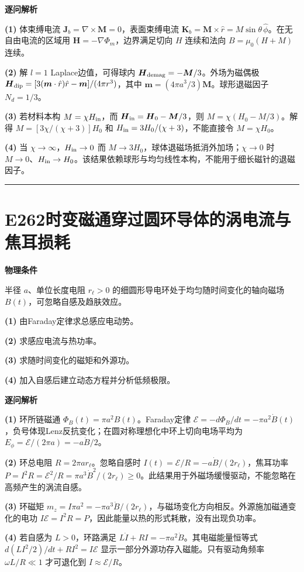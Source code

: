 \documentclass[UTF8,a4paper,11pt,oneside,openany]{ctexbook}
\begin{document}
\par\medskip\noindent\textbf{逐问解析}
\par\noindent\textbf{(1)} 体束缚电流 \(\boldsymbol J_b=\nabla\times\boldsymbol M=0\)，表面束缚电流 \(\boldsymbol K_b=\boldsymbol M\times\hat r=M\sin\theta\,\hat\phi\)。在无自由电流的区域用 \(\boldsymbol H=-\nabla\Phi_m\)，边界满足切向 \(H\) 连续和法向 \(B=\mu_0(H+M)\) 连续。
\par\noindent\textbf{(2)} 解 \(l=1\) Laplace边值，可得球内 \(\boldsymbol H_{\rm demag}=-\boldsymbol M/3\)。外场为磁偶极 \(\boldsymbol H_{\rm dip}=[3(\boldsymbol m\cdot\hat r)\hat r-\boldsymbol m]/(4\pi r^3)\)，其中 \(\boldsymbol m=(4\pi a^3/3)\boldsymbol M\)。球形退磁因子 \(N_d=1/3\)。
\par\noindent\textbf{(3)} 若材料本构 \(M=\chi H_{\rm in}\)，而 \(\boldsymbol H_{\rm in}=\boldsymbol H_0-\boldsymbol M/3\)，则 \(M=\chi(H_0-M/3)\)。解得 \(M=[3\chi/(\chi+3)]H_0\) 和 \(H_{\rm in}=3H_0/(\chi+3)\)，不能直接令 \(M=\chi H_0\)。
\par\noindent\textbf{(4)} 当 \(\chi\to\infty\)，\(H_{\rm in}\to0\) 而 \(M\to3H_0\)，球体退磁场抵消外加场；\(\chi\to0\) 时 \(M\to0\)、\(H_{\rm in}\to H_0\)。该结果依赖球形与均匀线性本构，不能用于细长磁针的退磁因子。

\par\bigskip\hrule\bigskip
\section*{E262\quad 时变磁通穿过圆环导体的涡电流与焦耳损耗}
\textbf{物理条件}\par 半径 \(a\)、单位长度电阻 \(r_\ell>0\) 的细圆形导电环处于均匀随时间变化的轴向磁场 \(B(t)\)，可忽略自感及趋肤效应。
\par\noindent\textbf{(1)} 由Faraday定律求总感应电动势。
\par\noindent\textbf{(2)} 求感应电流与热功率。
\par\noindent\textbf{(3)} 求随时间变化的磁矩和外源功。
\par\noindent\textbf{(4)} 加入自感后建立动态方程并分析低频极限。

\par\medskip\noindent\textbf{逐问解析}
\par\noindent\textbf{(1)} 环所链磁通 \(\Phi_B(t)=\pi a^2B(t)\)。Faraday定律 \(\mathcal E=-d\Phi_B/dt=-\pi a^2\dot B(t)\)，负号体现Lenz反抗变化；在圆对称理想化中环上切向电场平均为 \(E_\phi=\mathcal E/(2\pi a)=-a\dot B/2\)。
\par\noindent\textbf{(2)} 环总电阻 \(R=2\pi ar_\ell\)。忽略自感时 \(I(t)=\mathcal E/R=-a\dot B/(2r_\ell)\)，焦耳功率 \(P=I^2R=\mathcal E^2/R=\pi a^3\dot B^2/(2r_\ell)\ge0\)。此结果用于外磁场缓慢驱动，不能忽略在高频产生的涡流自感。
\par\noindent\textbf{(3)} 环磁矩 \(m_z=I\pi a^2=-\pi a^3\dot B/(2r_\ell)\)，与磁场变化方向相反。外源施加磁通变化的电功 \(I\mathcal E=I^2R=P\)，因此能量以热的形式耗散，没有出现负功率。
\par\noindent\textbf{(4)} 若自感为 \(L>0\)，环路满足 \(L\dot I+RI=-\pi a^2\dot B\)。其电磁能量恒等式 \(d(LI^2/2)/dt+RI^2=I\mathcal E\) 显示一部分外源功存入磁能。只有驱动角频率 \(\omega L/R\ll1\) 才可退化到 \(I\approx\mathcal E/R\)。
\end{document}
